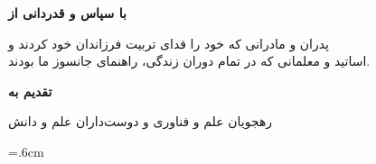 \documentclass[oneside,openany,mscS]{SBU-Thesis}
\begin{document}
	
\firstPage %
\davaranPage %

{
	\newpage
	\thispagestyle{plain}
	\noindent
	\large{\textbf{با سپاس و قدردانی از}}
	
	\noindent
	پدران و مادرانی که خود را فدای تربیت فرزاندان خود کردند و\\
	اساتید و معلمانی که در تمام دوران زندگی، راهنمای جانسوز ما بودند.
	
	
	\vspace{14cm}	
	
	
	\pagebreak
}

\rightsPage %
\copyRightPage %

{
	\newpage
	\thispagestyle{plain}
	\large{\textbf{تقدیم به}}
	
	\begin{center}
		رهجويان علم و فناوری و دوست‌داران علم و دانش
	\end{center}
	
	\vspace{14cm}	
	
	
	\pagebreak
}
\tableofcontents %
\listoffigures \newpage %
\listoftables \newpage %

	
\abstractPage %
		




	

\newpage



\baselineskip=.6cm

%
%

\baselineskip=1cm


%
%
\latinFirstPage %

	
\end{document}

